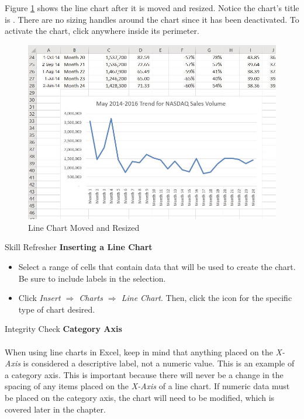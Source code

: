 Figure \ref{04:fig04} shows the line chart after it is moved and resized. Notice the chart's title is . There are no sizing handles around the chart since it has been deactivated. To activate the chart, click anywhere inside its perimeter.

\begin{figure}[H]
	\centering
	\includegraphics[width=\maxwidth{.95\linewidth}]{gfx/ch04_fig04}
	\caption{Line Chart Moved and Resized}
	\label{04:fig04}
\end{figure}

\begin{center}
	\begin{sklbox}{Skill Refresher}
		\textbf{Inserting a Line Chart}
		\\
		\begin{itemize}
			\setlength{\itemsep}{0pt}
			\setlength{\parskip}{0pt}
			\setlength{\parsep}{0pt}

			\item Select a range of cells that contain data that will be used to create the chart. Be sure to include labels in the selection.
			\item Click \textit{Insert $ \Rightarrow $ Charts $ \Rightarrow $ Line Chart}. Then, click the icon for the specific type of chart desired.
			
		\end{itemize}
	\end{sklbox}
\end{center}

\begin{center}
	\begin{infobox}{Integrity Check}
		\textbf{Category Axis}
		\\
		\\
		When using line charts in Excel, keep in mind that anything placed on the \textit{X-Axis} is considered a descriptive label, not a numeric value. This is an example of a category axis. This is important because there will never be a change in the spacing of any items placed on the \textit{X-Axis} of a line chart. If numeric data must be placed on the category axis, the chart will need to be modified, which is covered later in the chapter.
	\end{infobox}
\end{center}


